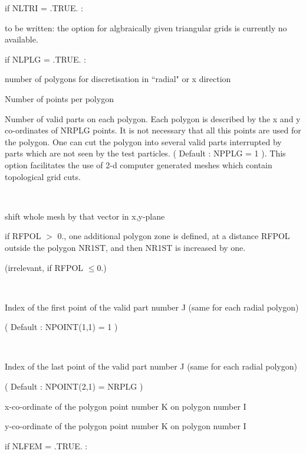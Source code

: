 if NLTRI = .TRUE. :
\begin{list}{ }{}
\item[{\bf TRIN, TROT, TRCH, EXTR }]
to be written: the option for algbraically given triangular grids is currently
no available.

\end{list}
if NLPLG = .TRUE. :
\begin{list}{ }{}
\item[{\bf NR1ST }]
number of polygons for discretisation in ``radial" or x direction
\item[{\bf NRPLG }]
Number of points per polygon
\item[{\bf NPPLG }]
Number of valid parts on each polygon.
Each polygon is described by the x and y
co-ordinates of
NRPLG points. It is not necessary that all this
points are used for the
polygon. One can cut the polygon into several valid parts interrupted
by parts which are not seen by the test particles. ( Default :
NPPLG = 1 ). This option facilitates the use of 2-d computer generated
meshes which contain topological grid cuts.
\item[{\bf XPCOR,YPCOR }] ~

shift whole mesh by that vector in x,y-plane
\item[{\bf RFPOL }]
if RFPOL $>$ 0., one additional polygon zone is defined,
at a distance RFPOL outside the polygon NR1ST,
and then NR1ST is increased by one.

(irrelevant, if RFPOL $\le 0$.)
\item[{\bf NPOINT(1,J) }] ~

Index of the first point of the valid part number J
(same for each radial polygon)

( Default : NPOINT(1,1) = 1 )
\item[{\bf NPOINT(2,J) }] ~

Index of the last point of the valid part number J
(same for each radial polygon)

( Default : NPOINT(2,1) = NRPLG )
\item[{\bf XPOL(K,I) }]
x-co-ordinate of the polygon point number K on polygon number I
\item[{\bf YPOL(K,I) }]
y-co-ordinate of the polygon point number K on polygon number I
\end{list}
if NLFEM = .TRUE. :
